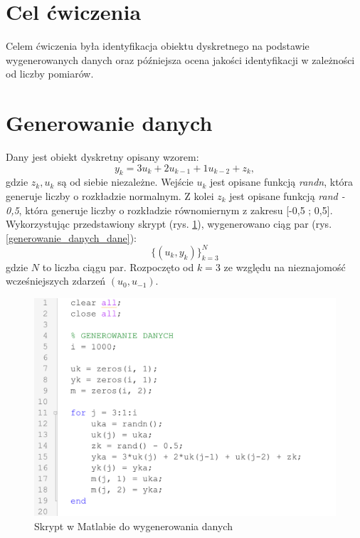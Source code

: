 \documentclass[12pt]{article}
\begin{document}
\renewcommand{\figurename}{Rys.}



\tableofcontents
\newpage

\section{Cel ćwiczenia}
Celem ćwiczenia była identyfikacja obiektu dyskretnego na podstawie wygenerowanych danych oraz późniejsza ocena jakości identyfikacji w zależności od liczby pomiarów.

\section{Generowanie danych}
Dany jest obiekt dyskretny opisany wzorem:
\begin{equation}
    y_k = 3u_k+2u_{k-1} + 1u_{k-2} + z_k,
    \label{wzor_dyskretny}
\end{equation}
gdzie $z_k, u_k$ są od siebie niezależne. Wejście $u_k$ jest opisane funkcją \textit{randn}, która generuje liczby o rozkładzie normalnym. Z kolei $z_k$ jest opisane funkcją \textit{rand - 0,5}, która generuje liczby o rozkładzie równomiernym z zakresu [-0,5 ; 0,5]. Wykorzystując przedstawiony skrypt (rys. \ref{generowanie_danych_skrypt}), wygenerowano ciąg par (rys. \ref{generowanie_danych_dane}):
\begin{equation}
    \{(u_k, y_k)\}^N_{k=3}
\end{equation}
gdzie $N$ to liczba ciągu par. Rozpoczęto od $k=3$ ze względu na nieznajomość wcześniejszych zdarzeń $(u_0, u_{-1})$.

\begin{figure}[H]
    \centering
    \includegraphics[scale=0.4]{generowanie_danych_skrypt.png}
    \caption{Skrypt w Matlabie do wygenerowania danych}
    \label{generowanie_danych_skrypt}
\end{figure}
\end{document}
